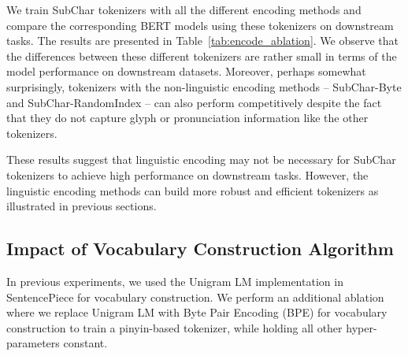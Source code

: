 We train SubChar tokenizers with all the different encoding methods and compare the corresponding BERT models using these tokenizers on downstream tasks. The results are presented in Table~\ref{tab:encode_ablation}. We observe that the differences between these different tokenizers are rather small in terms of the model performance on downstream datasets. Moreover, perhaps somewhat surprisingly, tokenizers with the non-linguistic encoding methods -- SubChar-Byte and SubChar-RandomIndex -- can also perform competitively despite the fact that they do not capture glyph or pronunciation information like the other tokenizers. 

These results suggest that linguistic encoding may not be necessary for SubChar tokenizers to achieve high performance on downstream tasks. However, the linguistic encoding methods can build more robust and efficient tokenizers as illustrated in previous sections.









\subsection{Impact of Vocabulary Construction Algorithm}
\label{sec:bpe}

In previous experiments, we used the Unigram LM implementation in SentencePiece for vocabulary construction. We perform an additional ablation where we replace Unigram LM with Byte Pair Encoding (BPE) for vocabulary construction to train a pinyin-based tokenizer, while holding all other hyper-parameters constant. 

